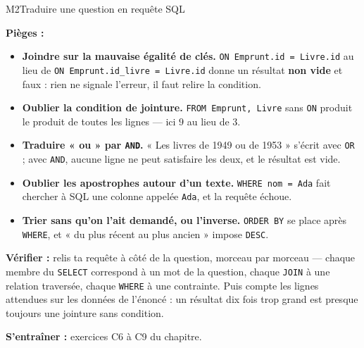 \begin{fichemethode}{M2}{Traduire une question en requête SQL}
%
%

\textbf{Pièges :}
\begin{itemize}
  \item \textbf{Joindre sur la mauvaise égalité de clés.} \texttt{ON Emprunt.id = Livre.id}
    au lieu de \texttt{ON Emprunt.id\_livre = Livre.id} donne un résultat \textbf{non vide} et
    faux : rien ne signale l'erreur, il faut relire la condition.
  \item \textbf{Oublier la condition de jointure.} \texttt{FROM Emprunt, Livre} sans
    \texttt{ON} produit le produit de toutes les lignes — ici $9$ au lieu de $3$.
  \item \textbf{Traduire « ou » par \texttt{AND}.} « Les livres de 1949 ou de 1953 » s'écrit
    avec \texttt{OR} ; avec \texttt{AND}, aucune ligne ne peut satisfaire les deux, et le
    résultat est vide.
  \item \textbf{Oublier les apostrophes autour d'un texte.} \texttt{WHERE nom = Ada} fait
    chercher à SQL une colonne appelée \texttt{Ada}, et la requête échoue.
  \item \textbf{Trier sans qu'on l'ait demandé, ou l'inverse.} \texttt{ORDER BY} se place
    après \texttt{WHERE}, et « du plus récent au plus ancien » impose \texttt{DESC}.
\end{itemize}

\textbf{Vérifier :} relis ta requête à côté de la question, morceau par morceau — chaque
membre du \texttt{SELECT} correspond à un mot de la question, chaque \texttt{JOIN} à une
relation traversée, chaque \texttt{WHERE} à une contrainte. Puis compte les lignes attendues
sur les données de l'énoncé : un résultat dix fois trop grand est presque toujours une
jointure sans condition.

\textbf{S'entraîner :} exercices C6 à C9 du chapitre.
\end{fichemethode}
